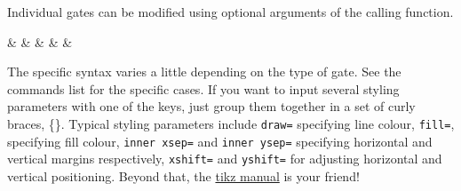 \documentclass[aps,pra,10pt,nofootinbib]{revtex4-2}
\begin{document}
Individual gates can be modified using optional arguments of the calling function.
\begin{Code}
  \begin{quantikz}
    &  & \phase[style={green},label style={label position=above}]{\beta} &  & & \meter[style={draw=blue}]{\ket{\pm}}
  \end{quantikz}
\end{Code}
The specific syntax varies a little depending on the type of gate. See the commands list for the specific cases.
If you want to input several styling parameters with one of the keys, just group them together in a set of curly braces, \{\}. Typical styling parameters include \verb!draw=! specifying line colour, \verb!fill=!, specifying fill colour, \verb!inner xsep=! and \verb!inner ysep=! specifying horizontal and vertical margins respectively, \verb!xshift=! and \verb!yshift=! for adjusting horizontal and vertical positioning. Beyond that, the \href{http://mirrors.ctan.org/graphics/pgf/base/doc/pgfmanual.pdf}{tikz manual} is your friend!
\end{document}
